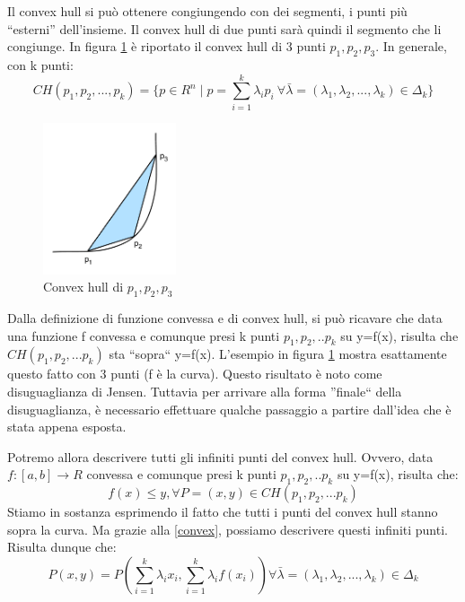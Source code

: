 Il convex hull si può ottenere congiungendo con dei segmenti, i punti più ``esterni'' dell'insieme. Il convex hull di due punti sarà 
quindi il segmento che li congiunge. In figura \ref{fig:convexhull} è riportato il convex hull di 3 punti $p_1,p_2,p_3$. In generale, con k punti:
\begin{equation}
 CH(p_1,p_2,...,p_k)=\{ p \in R^n \mid p=\sum_{i=1}^k \lambda_i p_i \ \forall \bar{\lambda}=(\lambda_1,\lambda_2,...,\lambda_k) 
\in \Delta_k\}
\label{convex}
\end{equation}

\begin{figure}[htbp]
\begin{center}
	\includegraphics[width=0.35\textwidth]{img/convexhull.pdf}
\caption{Convex hull di $p_1,p_2,p_3$}
\label{fig:convexhull}
\end{center}
\end{figure}

Dalla definizione di funzione convessa e di convex hull, si può ricavare che data una funzione f convessa e comunque presi k punti $p_1,p_2,..p_k$ su y=f(x), risulta che $CH(p_1,p_2,...p_k)$ sta ``sopra`` y=f(x). L'esempio in figura \ref{fig:convexhull} mostra esattamente questo fatto con 3 punti (f è la curva).
Questo risultato è noto come disuguaglianza di Jensen. Tuttavia per arrivare alla forma ''finale`` della disuguaglianza, è necessario effettuare qualche passaggio a partire dall'idea che è stata appena esposta.

Potremo allora descrivere tutti gli infiniti punti del convex hull. Ovvero, data $f: [a,b] \to R$ convessa e comunque presi k punti 
$p_1,p_2,..p_k$ su y=f(x), risulta che:
\[
f(x) \le y, \forall P=(x,y) \in CH(p_1,p_2,...p_k)
\]
Stiamo in sostanza esprimendo il fatto che tutti i punti del convex hull stanno sopra la curva. Ma grazie alla \eqref{convex}, possiamo 
descrivere questi infiniti punti. Risulta dunque che:
\[
 P(x,y)=P \left (\sum_{i=1}^k \lambda_i x_i, \sum_{i=1}^k \lambda_i f(x_i) \right)  
                 \forall \bar{\lambda}=(\lambda_1,\lambda_2,...,\lambda_k) \in \Delta_k
\]

